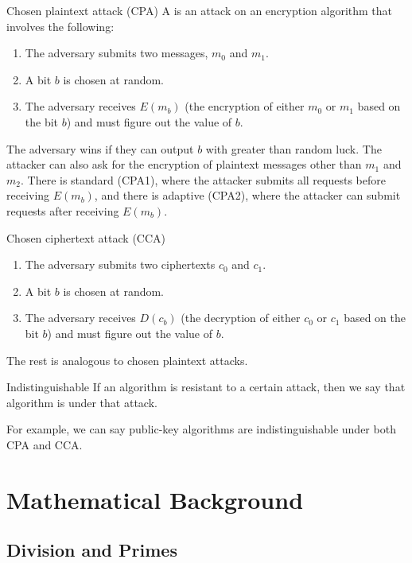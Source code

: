 \begin{tecbox}{Chosen plaintext attack (CPA)}{}
    A  is an attack on an encryption algorithm that involves the following:
    \begin{enumerate}[noitemsep]
        \item The adversary submits two messages, $m_0$ and $m_1$.
        \item A bit $b$ is chosen at random.
        \item The adversary receives $E(m_b)$ (the encryption of either $m_0$ or $m_1$ based on the bit $b$) and must figure out the value of $b$.
    \end{enumerate}
    The adversary wins if they can output $b$ with greater than random luck. The attacker can also ask for the encryption of plaintext messages other than $m_1$ and $m_2$. There is standard (CPA1), where the attacker submits all requests before receiving $E(m_b)$, and there is adaptive (CPA2), where the attacker can submit requests after receiving $E(m_b)$.
\end{tecbox}

\begin{tecbox}{Chosen ciphertext attack (CCA)}{}
    \begin{enumerate}
        \item The adversary submits two ciphertexts $c_0$ and $c_1$.
        \item A bit $b$ is chosen at random.
        \item The adversary receives $D(c_b)$ (the decryption of either $c_0$ or $c_1$ based on the bit $b$) and must figure out the value of $b$.
    \end{enumerate}
    The rest is analogous to chosen plaintext attacks.
\end{tecbox}

\begin{dfnbox}{Indistinguishable}{}
    If an algorithm is resistant to a certain attack, then we say that algorithm is  under that attack.
\end{dfnbox}

For example, we can say public-key algorithms are indistinguishable under both CPA and CCA.

\section{Mathematical Background}

\subsection{Division and Primes}

